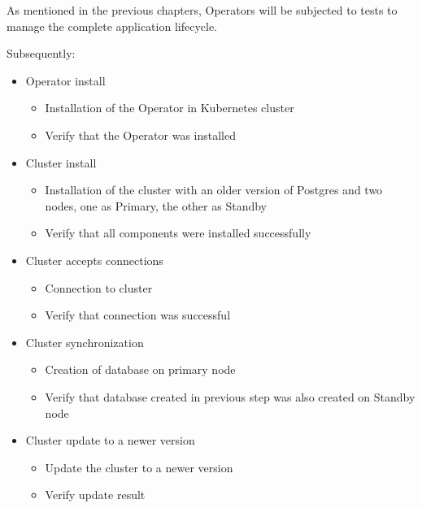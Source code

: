 












As mentioned in the previous chapters, Operators will be subjected to tests to manage the complete application lifecycle.

Subsequently:
\begin{itemize}
    \item Operator install
          \begin{itemize}
              \item Installation of the Operator in Kubernetes cluster
              \item Verify that the Operator was installed
          \end{itemize}
    \item Cluster install
          \begin{itemize}
              \item Installation of the cluster with an older version of Postgres and two nodes, one as Primary, the other as Standby
              \item Verify that all components were installed successfully
          \end{itemize}
    \item Cluster accepts connections
          \begin{itemize}
              \item Connection to cluster
              \item Verify that connection was successful
          \end{itemize}
    \item Cluster synchronization
          \begin{itemize}
              \item Creation of database on primary node
              \item Verify that database created in previous step was also created on Standby node
          \end{itemize}
    \item Cluster update to a newer version
          \begin{itemize}
              \item Update the cluster to a newer version
              \item Verify update result

\end{itemize}
\end{itemize}
